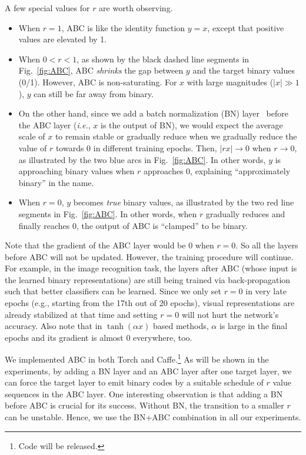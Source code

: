 \documentclass[runningheads]{llncs}
\begin{document}
A few special values for $r$ are worth observing.
\begin{itemize}
	\item When $r=1$, ABC is like the identity function $y=x$, except that positive values are elevated by 1.
	\item When $0<r<1$, as shown by the black dashed line segments in Fig.~\ref{fig:ABC}, ABC \emph{shrinks} the gap between $y$ and the target binary values (0/1). However, ABC is non-saturating. For $x$ with large magnitudes ($|x| \gg 1$), $y$ can still be far away from binary.
	\item On the other hand, since we add a batch normalization (BN) layer~\cite{bn} before the ABC layer (\emph{i.e.}, $x$ is the output of BN), we would expect the average scale of $x$ to remain stable or gradually reduce when we gradually reduce the value of $r$ towards 0 in different training epochs. Then, $|rx| \rightarrow 0$ when $r \rightarrow 0$, as illustrated by the two blue arcs in Fig.~\ref{fig:ABC}. In other words, $y$ is approaching binary values when $r$ approaches 0, explaining ``approximately binary'' in the name.
	\item When $r=0$, $y$ becomes \emph{true} binary values, as illustrated by the two red line segments in Fig.~\ref{fig:ABC}. In other words, when $r$ gradually reduces and finally reaches 0, the output of ABC is ``clamped'' to be binary.
\end{itemize}

Note that the gradient of the ABC layer would be $0$ when $r=0$. So all the layers before ABC will not be updated. However, the training procedure will continue. For example, in the image recognition task, the layers after ABC (whose input is the learned binary representations) are still being trained via back-propagation such that better classifiers can be learned. Since we only set $r=0$ in very late epochs (e.g., starting from the 17th out of 20 epochs), visual representations are already stabilized at that time and setting $r=0$ will not hurt the network's accuracy. Also note that in $\tanh(\alpha x)$ based methods, $\alpha$ is large in the final epochs and its gradient is almost 0 everywhere, too.

We implemented ABC in both Torch and Caffe.\footnote{Code will be released.} As will be shown in the experiments, by adding a BN layer and an ABC layer after one target layer, we can force the target layer to emit binary codes by a suitable schedule of $r$ value sequences in the ABC layer. One interesting observation is that adding a BN before ABC is crucial for its success. Without BN, the transition to a smaller $r$ can be unstable. Hence, we use the BN+ABC combination in all our experiments.
\end{document}
